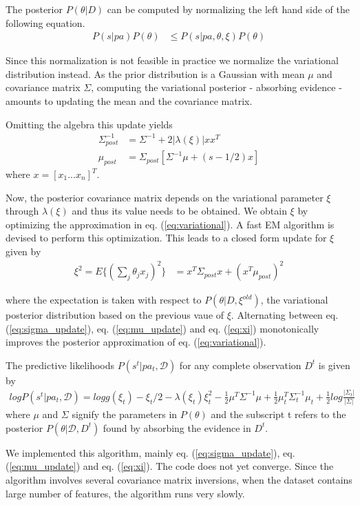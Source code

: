 The posterior $P(\theta|D)$ can be computed by normalizing the left hand side of the following equation.
\begin{align}
\label{eq:variational}
P(s|pa)P(\theta) &\leq P(s|pa, \theta, \xi)P(\theta)
\end{align}

Since this normalization is not feasible in practice we normalize the variational distribution instead. As the prior distribution is a Gaussian with mean $\mu$ and covariance matrix $\Sigma$, computing the variational posterior - absorbing evidence - amounts to updating the mean and the covariance matrix. 

Omitting the algebra this update yields 
\begin{align}
\label{eq:sigma_update}
\Sigma^{-1}_{post} &= \Sigma^{-1} + 2|\lambda(\xi)|xx^T\\
\label{eq:mu_update}
\mu_{post} &= \Sigma_{post}[\Sigma^{-1}\mu + (s - 1/2)x]
\end{align}
where $x = [x_1 ...x_n]^T$. 

Now, the posterior covariance matrix depends on the variational parameter $\xi$ through $\lambda(\xi)$ and thus its value needs to be obtained. We obtain $\xi$ by optimizing the approximation in eq. (\ref{eq:variational}). A fast EM algorithm is devised to perform this optimization. This leads to a closed form update for $\xi$ given by 
\begin{align}
\label{eq:xi}
\xi^2 = E\{(\sum_j\theta_jx_j)^2\} &= x^T\Sigma_{post}x + (x^T\mu_{post})^2
\end{align}

where the expectation is taken with respect to $P(\theta|D, \xi^{old})$, the variational posterior distribution based on the previous vaue of $\xi$. Alternating between eq. (\ref{eq:sigma_update}), eq. (\ref{eq:mu_update}) and eq. (\ref{eq:xi}) monotonically improves the posterior approximation of eq. (\ref{eq:variational}).

The predictive likelihoods $P(s^t | pa_t, \mathcal{D})$ for any complete observation $D^t$ is given by
\begin{align}
  logP(s^t|pa_t, \mathcal{D}) = logg(\xi_t) - \xi_t/2 - \lambda(\xi_t)\xi_t^2 - \frac{1}{2}\mu^T\Sigma^{-1}\mu + \frac{1}{2}\mu^T_t\Sigma^{-1}_t\mu_t + \frac{1}{2}log\frac{|\Sigma_t|}{|\Sigma|}
\end{align}
where $\mu$ and $\Sigma$ signify the parameters in $P(\theta)$ and the subscript t refers to the posterior $P(\theta|\mathcal{D}, D^t)$ found by absorbing the evidence in $D^t$.

We implemented this algorithm, mainly eq. (\ref{eq:sigma_update}), eq. (\ref{eq:mu_update}) and eq. (\ref{eq:xi}). The code does not yet converge. Since the algorithm involves several covariance matrix inversions, when the dataset contains large number of features, the algorithm runs very slowly.
